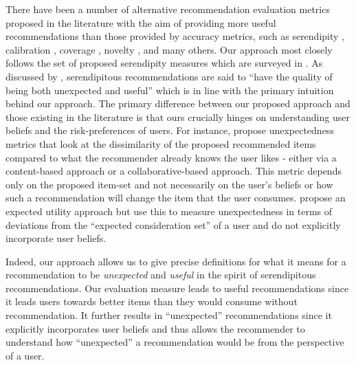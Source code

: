 \documentclass[manuscript]{acmart}
\begin{document}
\par 
There have been a number of alternative recommendation evaluation metrics proposed in the literature with the aim of providing more useful recommendations than those provided by accuracy metrics, such as serendipity \cite{kotkov2016survey}, calibration \cite{steck2018calibrated}, coverage \cite{ge2010beyond}, novelty \cite{vargas2011rank}, and many others. Our approach most closely follows the set of proposed serendipity measures which are surveyed in \cite{kotkov2016survey}. As discussed by \cite{maksai2015predicting},  serendipitous recommendations are said to ``have the quality of being both unexpected and useful'' which is in line with the primary intuition behind our approach. The primary difference between our proposed approach and those existing in the literature is that ours crucially hinges on understanding user beliefs and the risk-preferences of users. For instance, \cite{vargas2011rank, kaminskas2014measuring} propose unexpectedness metrics that look at the dissimilarity of the proposed recommended items compared to what the recommender already knows the user likes - either via a content-based approach or a collaborative-based approach. This metric depends only on the proposed item-set and not necessarily on the user's beliefs or how such a recommendation will change the item that the user consumes. \cite{adamopoulos2015unexpectedness} propose an expected utility approach but use this to measure unexpectedness in terms of deviations from the ``expected consideration set'' of a user and do not explicitly incorporate user beliefs.
\par 
Indeed, our approach allows us to give precise definitions for what it means for a recommendation to be \textit{unexpected} and \textit{useful} in the spirit of serendipitous recommendations. Our evaluation measure leads to useful recommendations since it leads users towards better items than they would consume without recommendation. It further results in ``unexpected'' recommendations since it explicitly incorporates user beliefs and thus allows the recommender to understand how ``unexpected'' a recommendation would be from the perspective of a user.


\end{document}
